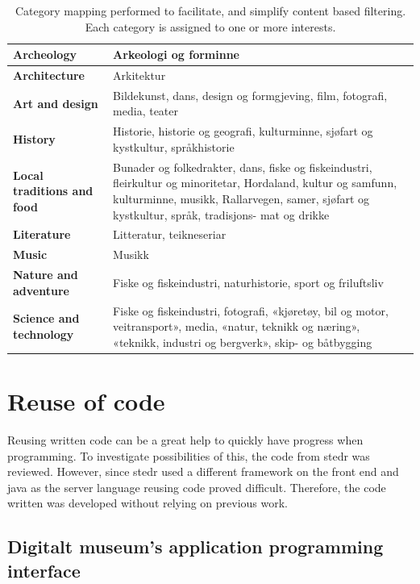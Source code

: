 \begin{table}[!h]
	\begin{center}
		\begin{tabular}{ | p{5cm} | p{12cm}|}
			\hline
			\textbf{Archeology} & Arkeologi og forminne \\ \hline
			\textbf{Architecture} & Arkitektur \\ \hline
			\textbf{Art and design} & Bildekunst, dans, design og formgjeving, film, fotografi, media, teater \\ \hline
			\textbf{History} & Historie, historie og geografi, kulturminne, sjøfart og kystkultur, språkhistorie \\ \hline
			\textbf{Local traditions and food} & Bunader og folkedrakter, dans, fiske og fiskeindustri, fleirkultur og minoritetar, Hordaland, kultur og samfunn, kulturminne, musikk, Rallarvegen, samer, sjøfart og kystkultur, språk, tradisjons- mat og drikke \\ \hline
			\textbf{Literature } & Litteratur, teikneseriar \\ \hline
			\textbf{Music} & Musikk \\ \hline
			\textbf{Nature and adventure} & Fiske og fiskeindustri, naturhistorie, sport og friluftsliv \\ \hline
			\textbf{Science and technology} & Fiske og fiskeindustri, fotografi, «kjøretøy, bil og motor, veitransport», media, «natur, teknikk og næring», «teknikk, industri og bergverk», skip- og båtbygging \\ \hline
		\end{tabular}
	\end{center}
	\caption{Category mapping performed to facilitate, and simplify content based filtering. Each category is assigned to one or more interests.}
	\label{Tab_categorymapping}
\end{table}

\section{Reuse of code}

Reusing written code can be a great help to quickly have progress when programming.  To investigate possibilities of this, the code from stedr was reviewed. However, since stedr used a different framework on the front end and java as the server language reusing code proved difficult. Therefore, the code written was developed without relying on previous work.

\subsection{Digitalt museum’s application programming interface}
\label{subsec_api}

